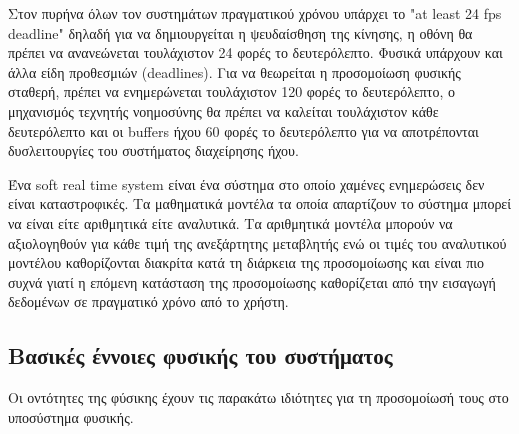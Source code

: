 Στον πυρήνα όλων τον συστημάτων πραγματικού χρόνου υπάρχει το "at least 24 fps deadline" δηλαδή για να δημιουργείται η ψευδαίσθηση της κίνησης, η οθόνη θα πρέπει να ανανεώνεται τουλάχιστον 24 φορές το δευτερόλεπτο. Φυσικά υπάρχουν και άλλα είδη προθεσμιών (deadlines). Για να θεωρείται η προσομοίωση φυσικής σταθερή, πρέπει να ενημερώνεται τουλάχιστον 120 φορές το δευτερόλεπτο, ο μηχανισμός τεχνητής νοημοσύνης θα πρέπει να καλείται τουλάχιστον κάθε δευτερόλεπτο και οι buffers ήχου 60 φορές το δευτερόλεπτο για να αποτρέπονται δυσλειτουργίες του συστήματος διαχείρησης ήχου.

Ένα soft real time system είναι ένα σύστημα στο οποίο χαμένες ενημερώσεις δεν είναι καταστροφικές.
Τα μαθηματικά μοντέλα τα οποία απαρτίζουν το σύστημα μπορεί να είναι είτε αριθμητικά είτε αναλυτικά. Τα αριθμητικά μοντέλα μπορούν να αξιολογηθούν για κάθε τιμή της ανεξάρτητης μεταβλητής ενώ οι τιμές του αναλυτικού μοντέλου καθορίζονται διακρίτα κατά τη διάρκεια της προσομοίωσης και είναι πιο συχνά γιατί η επόμενη κατάσταση της προσομοίωσης καθορίζεται από την εισαγωγή δεδομένων σε πραγματικό χρόνο από το χρήστη. \cite{realtime_collision04}

\subsection{Βασικές έννοιες φυσικής του συστήματος}
Οι οντότητες της φύσικης έχουν τις παρακάτω ιδιότητες για τη προσομοίωσή τους στο υποσύστημα φυσικής.

